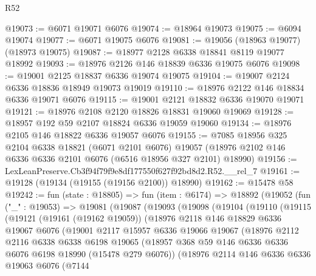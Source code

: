 \begin{lexlean}{R52}
\begin{coremodule}
@19073 := @6071 @19071 @6076
@19074 := @18964 @19073
@19075 := @6094 @19074
@19077 := @6071 @19075 @6076
@19081 := @19056 (@18963 @19077) (@18973 @19075)
@19087 := @18977 @2128 @6338 @18841 @8119 @19077 @18992
@19093 := @18976 @2126 @146 @18839 @6336 @19075 @6076
@19098 := @19001 @2125 @18837 @6336 @19074 @19075
@19104 := @19007 @2124 @6336 @18836 @18949 @19073 @19019
@19110 := @18976 @2122 @146 @18834 @6336 @19071 @6076
@19115 := @19001 @2121 @18832 @6336 @19070 @19071
@19121 := @18976 @2108 @2120 @18826 @18831 @19060 @19069
@19128 := @18957 @192 @59 @2107 @18824 @6336 @19059 @19060
@19134 := @18976 @2105 @146 @18822 @6336 @19057 @6076
@19155 := @7085
    @18956
    @325
    @2104
    @6338
    @18821
    (@6071 @2101 @6076)
    @19057
    (@18976 @2102 @146 @6336 @6336 @2101 @6076 (@6516 @18956 @327 @2101) @18990)
@19156 := LexLeanPreserve.Cb3f94f79f9e8df177550f627f92bd8d2.R52.__rel_7
@19161 := @19128 (@19134 (@19155 (@19156 @2100)) @18990)
@19162 := @15478 @58
@19242 := fun (state : @18805) =>
  fun (item : @6174) =>
  @18892
    (@19052
      (fun ("_" : @19053) =>
      @19081
        (@19087
          (@19093
            (@19098
              (@19104
                (@19110
                  (@19115
                    (@19121
                      (@19161 (@19162 @19059))
                      (@18976
                        @2118
                        @146
                        @18829
                        @6336
                        @19067
                        @6076
                        (@19001
                          @2117
                          @15957
                          @6336
                          @19066
                          @19067
                          (@18976
                            @2112
                            @2116
                            @6338
                            @6338
                            @6198
                            @19065
                            (@18957
                              @368
                              @59
                              @146
                              @6336
                              @6336
                              @6076
                              @6198
                              @18990
                              (@15478 @279 @6076))
                            (@18976
                              @2114
                              @146
                              @6336
                              @6336
                              @19063
                              @6076
                              (@7144

\end{coremodule}
\end{lexlean}
